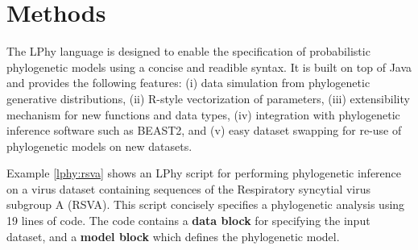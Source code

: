 \documentclass[10pt,letterpaper,table]{article}
\begin{document}
\section{Methods}
The LPhy language is designed to enable the specification of probabilistic phylogenetic models using a concise and readible syntax. 
It is built on top of Java and provides the following features: 
(i) data simulation from phylogenetic generative distributions, (ii) R-style vectorization of parameters, (iii) extensibility mechanism for new functions and data types, (iv) integration with phylogenetic inference software such as BEAST2, and (v) easy dataset swapping for re-use of phylogenetic models on new datasets.

Example \ref{lphy:rsva} shows an LPhy script for performing phylogenetic inference on a virus dataset containing sequences of the Respiratory syncytial virus subgroup A (RSVA). 
This script concisely specifies a phylogenetic analysis using 19 lines of code.  
The code contains a \textbf{data block} for specifying the input dataset, and a \textbf{model block} which defines the phylogenetic model. 
\end{document}
